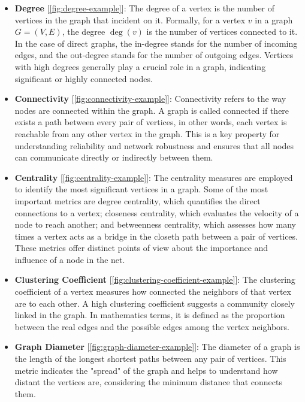 \documentclass[../Thesis.tex]{subfiles}
\begin{document}
	\begin{itemize}
		\item \textbf{Degree} [\autoref{fig:degree-example}]: The degree of a vertex is the number of vertices in the graph that incident on it. Formally, for a vertex \( v \) in a graph \( G = (V, E) \), the degree \( \deg(v) \) is the number of vertices connected to it. In the case of direct graphs, the in-degree stands for the number of incoming edges, and the out-degree stands for the number of outgoing edges. Vertices with high degrees generally play a crucial role in a graph, indicating significant or highly connected nodes.
		
		
		
		\item \textbf{Connectivity} [\autoref{fig:connectivity-example}]: Connectivity refers to the way nodes are connected within the graph. A graph is called connected if there exists a path between every pair of vertices, in other words, each vertex is reachable from any other vertex in the graph. This is a key property for understanding reliability and network robustness and ensures that all nodes can communicate directly or indirectly between them.
		
		
		\item \textbf{Centrality} [\autoref{fig:centrality-example}]: The centrality measures are employed to identify the most significant vertices in a graph. Some of the most important metrics are degree centrality, which quantifies the direct connections to a vertex; closeness centrality, which evaluates the velocity of a node to reach another; and betweenness centrality, which assesses how many times a vertex acts as a bridge in the closeth path between a pair of vertices. These metrics offer distinct points of view about the importance and influence of a node in the net.
		
		
		\item \textbf{Clustering Coefficient} [\autoref{fig:clustering-coefficient-example}]: The clustering coefficient of a vertex measures how connected the neighbors of that vertex are to each other. A high clustering coefficient suggests a community closely linked in the graph. In mathematics terms, it is defined as the proportion between the real edges and the possible edges among the vertex neighbors.
		
		
		\item \textbf{Graph Diameter} [\autoref{fig:graph-diameter-example}]: The diameter of a graph is the length of the longest shortest paths between any pair of vertices. This metric indicates the "spread" of the graph and helps to understand how distant the vertices are, considering the minimum distance that connects them.
		
		

\end{itemize}
\end{document}
